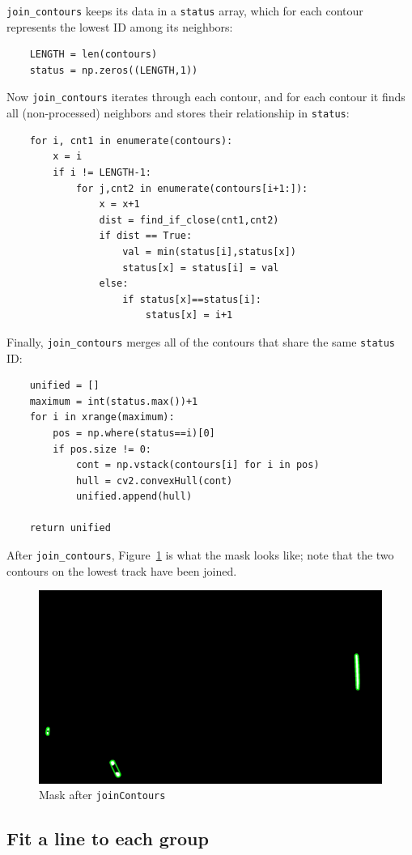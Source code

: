 \documentclass[notitlepage]{article}
\begin{document}
\texttt{join\_contours} keeps its data in a \texttt{status} array, which for each contour represents the lowest ID among its neighbors:
\begin{lstlisting}
    LENGTH = len(contours)
    status = np.zeros((LENGTH,1))
\end{lstlisting}

Now \texttt{join\_contours} iterates through each contour, and for each contour it finds all (non-processed) neighbors and stores their relationship in \texttt{status}:
\begin{lstlisting}
    for i, cnt1 in enumerate(contours):
        x = i    
        if i != LENGTH-1:
            for j,cnt2 in enumerate(contours[i+1:]):
                x = x+1
                dist = find_if_close(cnt1,cnt2)
                if dist == True:
                    val = min(status[i],status[x])
                    status[x] = status[i] = val
                else:
                    if status[x]==status[i]:
                        status[x] = i+1
\end{lstlisting}

Finally, \texttt{join\_contours} merges all of the contours that share the same \texttt{status} ID:
\begin{lstlisting}
    unified = []
    maximum = int(status.max())+1
    for i in xrange(maximum):
        pos = np.where(status==i)[0]
        if pos.size != 0:
            cont = np.vstack(contours[i] for i in pos)
            hull = cv2.convexHull(cont)
            unified.append(hull)

    return unified
\end{lstlisting}

After \texttt{join\_contours}, Figure~\ref{fig:mask4} is what the mask looks like; note that the two contours on the lowest track have been joined.

\begin{figure}[h]
	\centering
	\includegraphics[width=.45\textwidth]{mask4}
	\caption{Mask after \texttt{joinContours}\label{fig:mask4}}
\end{figure}

\subsection{Fit a line to each group}
\end{document}
